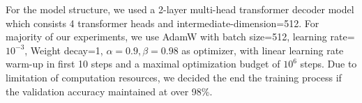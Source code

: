\documentclass{article}
\begin{document}
For the model structure, we used a 2-layer multi-head transformer decoder model which consists 4 transformer heads and intermediate-dimension=512. For majority of our experiments, we use AdamW with batch size=512, learning rate=$10^{-3}$, Weight decay=1, $\alpha =0.9, \beta=0.98$ as optimizer, with linear learning rate warm-up in first 10 steps and a maximal optimization budget of $10^6$ steps. Due to limitation of computation resources, we decided the end the training process if the validation accuracy maintained at over 98\%.










\end{document}
